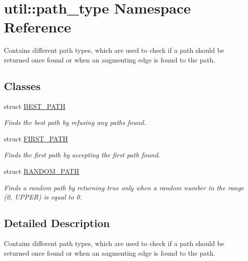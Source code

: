 \hypertarget{namespaceutil_1_1path__type}{}\section{util\+:\+:path\+\_\+type Namespace Reference}
\label{namespaceutil_1_1path__type}


Contains different path types, which are used to check if a path should be returned once found or when an augmenting edge is found to the path.  


\subsection*{Classes}
\begin{DoxyCompactItemize}
\item 
struct \hyperlink{structutil_1_1path__type_1_1_b_e_s_t___p_a_t_h}{B\+E\+S\+T\+\_\+\+P\+A\+TH}
\begin{DoxyCompactList}\small\item\em Finds the best path by refusing any paths found. \end{DoxyCompactList}\item 
struct \hyperlink{structutil_1_1path__type_1_1_f_i_r_s_t___p_a_t_h}{F\+I\+R\+S\+T\+\_\+\+P\+A\+TH}
\begin{DoxyCompactList}\small\item\em Finds the first path by accepting the first path found. \end{DoxyCompactList}\item 
struct \hyperlink{structutil_1_1path__type_1_1_r_a_n_d_o_m___p_a_t_h}{R\+A\+N\+D\+O\+M\+\_\+\+P\+A\+TH}
\begin{DoxyCompactList}\small\item\em Finds a random path by returning true only when a random number in the range (0, U\+P\+P\+ER) is equal to 0. \end{DoxyCompactList}\end{DoxyCompactItemize}


\subsection{Detailed Description}
Contains different path types, which are used to check if a path should be returned once found or when an augmenting edge is found to the path. 